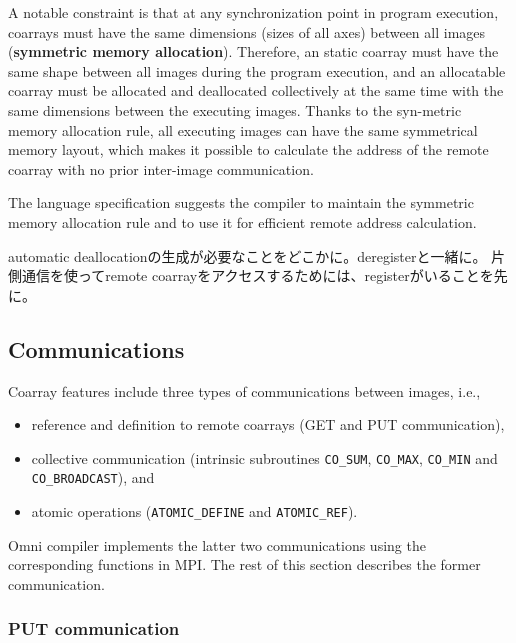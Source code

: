 A notable constraint is that at any synchronization point in program execution, 
coarrays must have the same dimensions (sizes of all axes) between all images
({\bf symmetric memory allocation}). 
Therefore, an static coarray must have the same shape between all images during 
the program execution, and an allocatable coarray must be allocated and deallocated 
collectively at the same time with the same dimensions between the executing images.
Thanks to the syn-metric memory allocation rule, all executing images can have
the same symmetrical memory layout, which makes it possible to calculate the address 
of the remote coarray with no prior inter-image communication.

\requirement
The language specification suggests the compiler to maintain the symmetric memory
allocation rule and to use it for efficient remote address calculation.


automatic deallocationの生成が必要なことをどこかに。deregisterと一緒に。
片側通信を使ってremote coarrayをアクセスするためには、registerがいることを先に。


\subsection{Communications}

Coarray features include three types of communications between images, i.e.,
\begin{itemize}
\item reference and definition to remote coarrays (GET and PUT communication),
\item collective communication (intrinsic subroutines {\tt CO\_SUM}, {\tt CO\_MAX}, 
{\tt CO\_MIN} and {\tt CO\_BROADCAST}), and
\item atomic operations ({\tt ATOMIC\_DEFINE} and {\tt ATOMIC\_REF}).
\end{itemize}

Omni compiler implements the latter two communications using the corresponding 
functions in MPI. The rest of this section describes the former communication.

\subsubsection{PUT communication}\label{sec:PUT}

